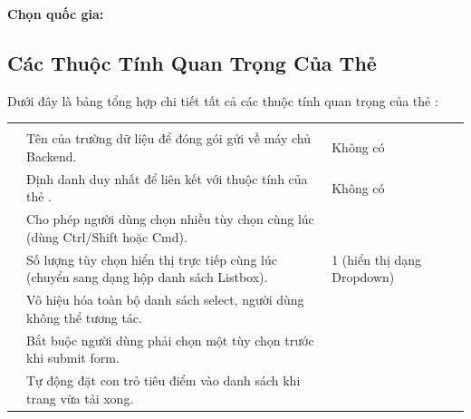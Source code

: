 \begin{browserWindow}
\sffamily\small
\textbf{Chọn quốc gia:} \par\vspace{4pt}
\tcbox[on line, arc=3pt, colback=white, colframe=primaryBlue!50, boxsep=3pt, left=8pt, right=20pt, top=3pt, bottom=3pt]{%
  \small \textcolor{black}{Việt Nam} \;\; \textcolor{primaryBlue}{\textbf{$\boldsymbol{\vee}$}}%
}
\end{browserWindow}

\subsection{Các Thuộc Tính Quan Trọng Của Thẻ }

Dưới đây là bảng tổng hợp chi tiết tất cả các thuộc tính quan trọng của thẻ :

\begin{prettyTableBox}
\begin{tabularx}{\linewidth}{K{2.4cm} Z K{2.5cm} Z}
 &  &  &  \\
 & Tên của trường dữ liệu để đóng gói gửi về máy chủ Backend. & Không có &  \\
 & Định danh duy nhất để liên kết với thuộc tính  của thẻ . & Không có &  \\
 & Cho phép người dùng chọn nhiều tùy chọn cùng lúc (dùng Ctrl/Shift hoặc Cmd). &  &  \\
 & Số lượng tùy chọn hiển thị trực tiếp cùng lúc (chuyển sang dạng hộp danh sách Listbox). & 1 (hiển thị dạng Dropdown) &  \\
 & Vô hiệu hóa toàn bộ danh sách select, người dùng không thể tương tác. &  &  \\
 & Bắt buộc người dùng phải chọn một tùy chọn trước khi submit form. &  &  \\
 & Tự động đặt con trỏ tiêu điểm vào danh sách khi trang vừa tải xong. &  &  \\
\end{tabularx}
\end{prettyTableBox}

